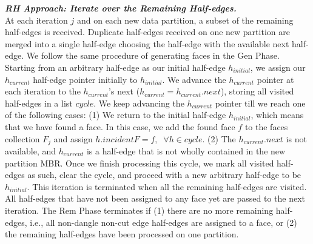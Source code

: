 \vspace{4pt}
\textit{\textbf{RH Approach: Iterate over the Remaining Half-edges.}}
\\
At each iteration $j$ and on each new data partition, a subset of the remaining half-edges is received. 
Duplicate half-edges received on one new partition are merged into a single half-edge choosing the half-edge with the available next half-edge.
We follow the same procedure of generating faces in the Gen Phase. Starting from an arbitrary half-edge as our initial half-edge $h_{initial}$, we assign our $h_{current}$ half-edge pointer initially to $h_{initial}$. We advance the $h_{current}$ pointer at each iteration to the $h_{current}$'s next ($h_{current} = h_{current}.next$), storing all visited half-edges in a list $cycle$. We keep advancing the $h_{current}$ pointer till we reach one of the following cases:
(1) We return to the initial half-edge $h_{initial}$, which means that we have found a face. In this case, we add the found face $f$ to the faces collection $F_j$ and assign $h.incidentF = f, \;\; \forall h \in cycle$.
(2) The $h_{current}.next$ is not available, and $h_{current}$ is a half-edge that is not wholly contained in the new partition MBR.
Once we finish processing this cycle, we mark all visited half-edges as such, clear the cycle, and proceed with a new arbitrary half-edge to be $h_{initial}$.
This iteration is terminated when all the remaining half-edges are visited. All half-edges that have not been assigned to any face yet are passed to the next iteration.
The Rem Phase terminates if (1) there are no more remaining half-edges, i.e., all non-dangle non-cut edge half-edges are assigned to a face, or (2) the remaining half-edges have been processed on one partition.

